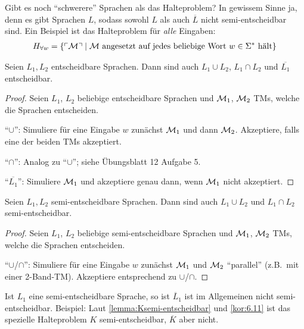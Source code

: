\begin{Bemerkung}
	Gibt es noch "`schwerere"' Sprachen als das Halteproblem?
	In gewissem Sinne ja, denn es gibt Sprachen $L$, sodass sowohl $L$ als auch $\overline{L}$ nicht semi-entscheidbar sind.
	Ein Beispiel ist das Halteproblem für \emph{alle} Eingaben:
	\begin{align*}
		H_{\forall w} = \{\ulcorner \mathcal{M} \urcorner \mid \text{$\mathcal{M}$ angesetzt auf jedes beliebige Wort $w \in \Sigma^*$ hält}\}
		\qedhere
	\end{align*}
\end{Bemerkung}

\begin{Satz}
	Seien $L_1, L_2$ entscheidbare Sprachen.
	Dann sind auch $L_1 \cup L_2$, $L_1 \cap L_2$ und $\overline{L_1}$ entscheidbar.
\end{Satz}

\begin{proof}
	Seien $L_1$, $L_2$ beliebige entscheidbare Sprachen und $\mathcal{M}_1$, $\mathcal{M}_2$ \ac{TM}s, welche die Sprachen entscheiden.

	"`$\cup$"': Simuliere für eine Eingabe $w$ zunächst $\mathcal{M}_1$ und dann $\mathcal{M}_2$.
	Akzeptiere, falls eine der beiden \ac{TM}s akzeptiert.

	"`$\cap$"': Analog zu "`$\cup$"'; siehe Übungsblatt 12 Aufgabe 5.

	"`$\overline{L_1}$"': Simuliere $\mathcal{M}_1$ und akzeptiere genau dann, wenn $\mathcal{M}_1$ nicht akzeptiert.
\end{proof}

\begin{Satz}\label{satz:SemidetCupCap}
	Seien $L_1, L_2$ semi-entscheidbare Sprachen.
	Dann sind auch $L_1 \cup L_2$ und $L_1 \cap L_2$ semi-entscheidbar.
\end{Satz}

\begin{proof}
	Seien $L_1$, $L_2$ beliebige semi-entscheidbare Sprachen und $\mathcal{M}_1$, $\mathcal{M}_2$ \ac{TM}s, welche die Sprachen entscheiden.

	"`$\cup$/$\cap$"': Simuliere für eine Eingabe $w$ zunächst $\mathcal{M}_1$ und $\mathcal{M}_2$ "`parallel"' (z.B.\ mit einer 2-Band-\ac{TM}).
	Akzeptiere entsprechend zu $\cup$/$\cap$.
\end{proof}

\begin{Bemerkung}
	Ist $L_1$ eine semi-entscheidbare Sprache, so ist $\overline{L}_1$ ist im Allgemeinen nicht semi-entscheidbar.
	Beispiel: Laut \autoref{lemma:Ksemi-entscheidbar} und \autoref{kor:6.11} ist das spezielle Halteproblem $K$ semi-entscheidbar, $\overline{K}$ aber nicht.
\end{Bemerkung}


